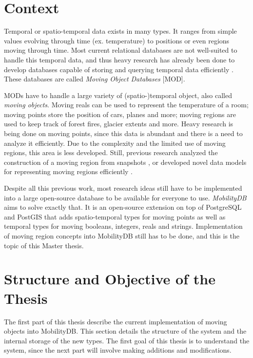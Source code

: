 
\section{Context}

Temporal or spatio-temporal data exists in many types. It ranges from simple values evolving through time (ex. temperature) to positions or even regions moving through time. Most current relational databases are not well-suited to handle this temporal data, and thus heavy research has already been done to develop databases capable of storing and querying temporal data efficiently \cite{moving_obj_databases}. These databases are called \textit{Moving Object Databases} [MOD].

MODs have to handle a large variety of (spatio-)temporal object, also called \textit{moving objects}. Moving reals can be used to represent the temperature of a room; moving points store the position of cars, planes and more; moving regions are used to keep track of forest fires, glacier extents and more. Heavy research is being done on moving points, since this data is abundant and there is a need to analyze it efficiently. Due to the complexity and the limited use of moving regions, this area is less developed. Still, previous research analyzed the construction of a moving region from snapshots \cite{repr_from_obs,high_quality_interpol}, or developed novel data models for representing moving regions efficiently \cite{polyhedra,fmregion}.

Despite all this previous work, most research ideas still have to be implemented into a large open-source database to be available for everyone to use. \textit{MobilityDB} \cite{mobilitydb} aims to solve exactly that. It is an open-source extension on top of PostgreSQL \cite{postgresql} and PostGIS \cite{postgis} that adds spatio-temporal types for moving points as well as temporal types for moving booleans, integers, reals and strings. Implementation of moving region concepts into MobilityDB still has to be done, and this is the topic of this Master thesis.

\section{Structure and Objective of the Thesis}

The first part of this thesis describe the current implementation of moving objects into MobilityDB. This section details the structure of the system and the internal storage of the new types. The first goal of this thesis is to understand the system, since the next part will involve making additions and modifications.

